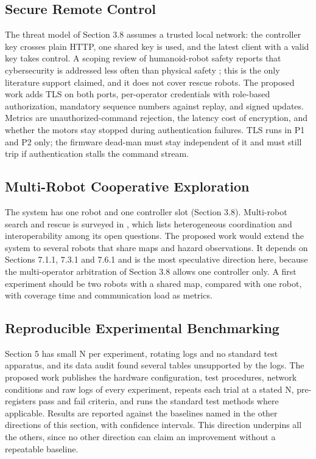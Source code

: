 \subsection{Secure Remote Control}

The threat model of Section 3.8 assumes a trusted local network: the controller key crosses plain HTTP, one shared key is used, and the latest client with a valid key takes control. A scoping review of humanoid-robot safety reports that cybersecurity is addressed less often than physical safety \cite{koczi2025}; this is the only literature support claimed, and it does not cover rescue robots. The proposed work adds TLS on both ports, per-operator credentials with role-based authorization, mandatory sequence numbers against replay, and signed updates. Metrics are unauthorized-command rejection, the latency cost of encryption, and whether the motors stay stopped during authentication failures. TLS runs in P1 and P2 only; the firmware dead-man must stay independent of it and must still trip if authentication stalls the command stream.

\subsection{Multi-Robot Cooperative Exploration}

The system has one robot and one controller slot (Section 3.8). Multi-robot search and rescue is surveyed in \cite{queralta2020}, which lists heterogeneous coordination and interoperability among its open questions. The proposed work would extend the system to several robots that share maps and hazard observations. It depends on Sections 7.1.1, 7.3.1 and 7.6.1 and is the most speculative direction here, because the multi-operator arbitration of Section 3.8 allows one controller only. A first experiment should be two robots with a shared map, compared with one robot, with coverage time and communication load as metrics.

\subsection{Reproducible Experimental Benchmarking}

Section 5 has small N per experiment, rotating logs and no standard test apparatus, and its data audit found several tables unsupported by the logs. The proposed work publishes the hardware configuration, test procedures, network conditions and raw logs of every experiment, repeats each trial at a stated N, pre-registers pass and fail criteria, and runs the standard test methods \cite{jacoff2012} where applicable. Results are reported against the baselines named in the other directions of this section, with confidence intervals. This direction underpins all the others, since no other direction can claim an improvement without a repeatable baseline.
